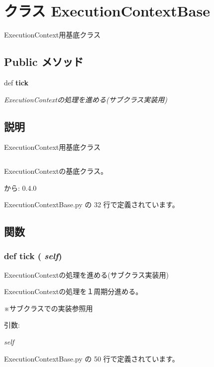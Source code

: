 \section{クラス ExecutionContextBase}
\label{classsource__py_1_1_execution_context_base_1_1_execution_context_base}
ExecutionContext用基底クラス  


\subsection*{Public メソッド}
\begin{CompactItemize}
\item 
def {\bf tick}
\begin{CompactList}\small\item\em ExecutionContextの処理を進める(サブクラス実装用) \item\end{CompactList}\end{CompactItemize}


\subsection{説明}
ExecutionContext用基底クラス 



\footnotesize\begin{verbatim}
\end{verbatim}
\normalsize


ExecutionContextの基底クラス。

\begin{Desc}
\item[から:]0.4.0 \end{Desc}


 ExecutionContextBase.py の 32 行で定義されています。

\subsection{関数}
\subsubsection{\setlength{\rightskip}{0pt plus 5cm}def tick ( {\em self})}\label{classsource__py_1_1_execution_context_base_1_1_execution_context_base_125397433d5d1d506776ec7982be4b92}


ExecutionContextの処理を進める(サブクラス実装用) 

ExecutionContextの処理を１周期分進める。\par
 ※サブクラスでの実装参照用

\begin{Desc}
\item[引数:]
\begin{description}
\item[{\em self}]\end{description}
\end{Desc}


 ExecutionContextBase.py の 50 行で定義されています。